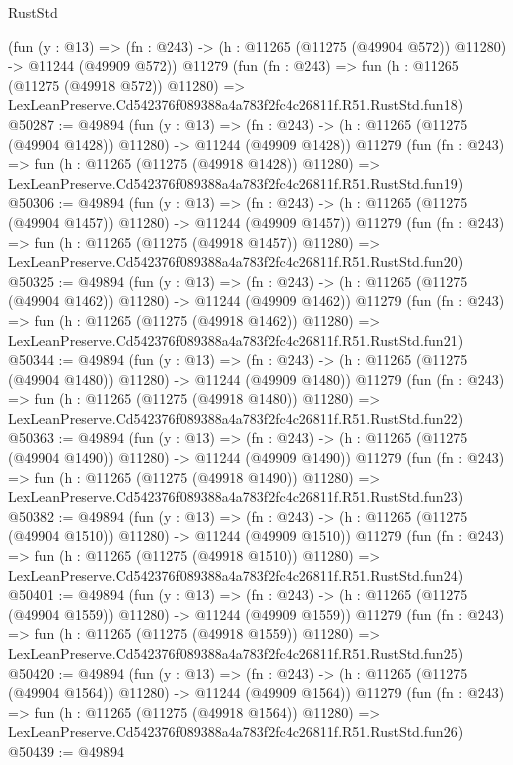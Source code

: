 \begin{lexlean}{RustStd}
\begin{coremodule}
    (fun (y : @13) =>
    (fn : @243) -> (h : @11265 (@11275 (@49904 @572)) @11280) -> @11244 (@49909 @572))
    @11279
    (fun (fn : @243) =>
    fun (h : @11265 (@11275 (@49918 @572)) @11280) =>
    LexLeanPreserve.Cd542376f089388a4a783f2fc4c26811f.R51.RustStd.fun18)
@50287 := @49894
    (fun (y : @13) =>
    (fn : @243) -> (h : @11265 (@11275 (@49904 @1428)) @11280) -> @11244 (@49909 @1428))
    @11279
    (fun (fn : @243) =>
    fun (h : @11265 (@11275 (@49918 @1428)) @11280) =>
    LexLeanPreserve.Cd542376f089388a4a783f2fc4c26811f.R51.RustStd.fun19)
@50306 := @49894
    (fun (y : @13) =>
    (fn : @243) -> (h : @11265 (@11275 (@49904 @1457)) @11280) -> @11244 (@49909 @1457))
    @11279
    (fun (fn : @243) =>
    fun (h : @11265 (@11275 (@49918 @1457)) @11280) =>
    LexLeanPreserve.Cd542376f089388a4a783f2fc4c26811f.R51.RustStd.fun20)
@50325 := @49894
    (fun (y : @13) =>
    (fn : @243) -> (h : @11265 (@11275 (@49904 @1462)) @11280) -> @11244 (@49909 @1462))
    @11279
    (fun (fn : @243) =>
    fun (h : @11265 (@11275 (@49918 @1462)) @11280) =>
    LexLeanPreserve.Cd542376f089388a4a783f2fc4c26811f.R51.RustStd.fun21)
@50344 := @49894
    (fun (y : @13) =>
    (fn : @243) -> (h : @11265 (@11275 (@49904 @1480)) @11280) -> @11244 (@49909 @1480))
    @11279
    (fun (fn : @243) =>
    fun (h : @11265 (@11275 (@49918 @1480)) @11280) =>
    LexLeanPreserve.Cd542376f089388a4a783f2fc4c26811f.R51.RustStd.fun22)
@50363 := @49894
    (fun (y : @13) =>
    (fn : @243) -> (h : @11265 (@11275 (@49904 @1490)) @11280) -> @11244 (@49909 @1490))
    @11279
    (fun (fn : @243) =>
    fun (h : @11265 (@11275 (@49918 @1490)) @11280) =>
    LexLeanPreserve.Cd542376f089388a4a783f2fc4c26811f.R51.RustStd.fun23)
@50382 := @49894
    (fun (y : @13) =>
    (fn : @243) -> (h : @11265 (@11275 (@49904 @1510)) @11280) -> @11244 (@49909 @1510))
    @11279
    (fun (fn : @243) =>
    fun (h : @11265 (@11275 (@49918 @1510)) @11280) =>
    LexLeanPreserve.Cd542376f089388a4a783f2fc4c26811f.R51.RustStd.fun24)
@50401 := @49894
    (fun (y : @13) =>
    (fn : @243) -> (h : @11265 (@11275 (@49904 @1559)) @11280) -> @11244 (@49909 @1559))
    @11279
    (fun (fn : @243) =>
    fun (h : @11265 (@11275 (@49918 @1559)) @11280) =>
    LexLeanPreserve.Cd542376f089388a4a783f2fc4c26811f.R51.RustStd.fun25)
@50420 := @49894
    (fun (y : @13) =>
    (fn : @243) -> (h : @11265 (@11275 (@49904 @1564)) @11280) -> @11244 (@49909 @1564))
    @11279
    (fun (fn : @243) =>
    fun (h : @11265 (@11275 (@49918 @1564)) @11280) =>
    LexLeanPreserve.Cd542376f089388a4a783f2fc4c26811f.R51.RustStd.fun26)
@50439 := @49894

\end{coremodule}
\end{lexlean}
